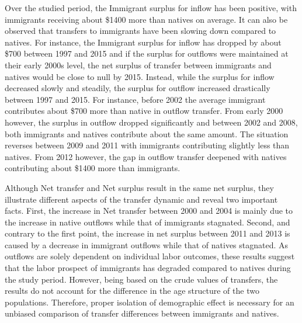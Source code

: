 \vspace{0.7em}\par
Over the studied period, the Immigrant surplus for inflow has been positive, with immigrants receiving about \$1400 more than natives on average.
It can also be observed that transfers to immigrants have been slowing down compared to natives.
For instance, the Immigrant surplus for inflow has dropped by about \$700 between 1997 and 2015 and if the surplus for outflows were maintained at their early 2000s level, the net surplus of transfer between immigrants and natives would be close to null by 2015.
Instead, while the surplus for inflow decreased slowly and steadily, the surplus for outflow increased drastically between 1997 and 2015.
For instance, before 2002 the average immigrant contributes about \$700 more than native in outflow transfer.
From early 2000 however, the surplus in outflow dropped significantly and between 2002 and 2008, both immigrants and natives contribute about the same amount.
The situation reverses between 2009 and 2011 with immigrants contributing slightly less than natives.
From 2012 however, the gap in outflow transfer deepened with natives contributing about \$1400 more than immigrants.

\vspace{0.7em}\par
Although Net transfer and Net surplus result in the same net surplus, they illustrate different aspects of the transfer dynamic and reveal two important facts.
First, the increase in Net transfer between 2000 and 2004 is mainly due to the increase in native outflows while that of immigrants stagnated.
Second, and contrary to the first point, the increase in net surplus between 2011 and 2013 is caused by a decrease in immigrant outflows while that of natives stagnated.
As outflows are solely dependent on individual labor outcomes, these results suggest that the labor prospect of immigrants has degraded compared to natives during the study period.
However, being based on the crude values of transfers, the results do not account for the difference in the age structure of the two populations.
Therefore, proper isolation of demographic effect is necessary for an unbiased comparison of transfer differences between immigrants and natives.















